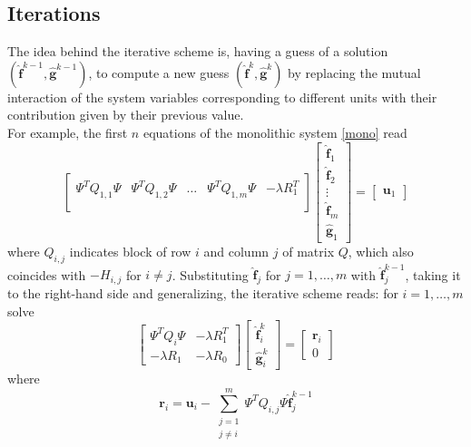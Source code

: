 \subsection{Iterations}
The idea behind the iterative scheme is, having a guess of a solution
$(\hat{\bm{f}}^{k-1},\hat{\bm{g}}^{k-1})$, to compute a new guess
$(\hat{\bm{f}}^k,\hat{\bm{g}}^k)$ by replacing the mutual interaction of the
system variables corresponding to different units with their contribution given
by their previous value.\\ For example, the first $n$ equations of the
monolithic system \ref{mono} read
\begin{equation}
	\begin{bmatrix}
		\Psi^TQ_{1,1}\Psi & \Psi^TQ_{1,2}\Psi & \dots & \Psi^TQ_{1,m}\Psi & -\lambda R_1^T \\
	\end{bmatrix}
	\begin{bmatrix}
		\hat{\bm{f}}_1 \\
		\hat{\bm{f}}_2 \\
		\vdots         \\
		\hat{\bm{f}}_m \\
		\hat{\bm{g}}_1
	\end{bmatrix}
	=
	\begin{bmatrix}
		\bm{u}_1
	\end{bmatrix}
\end{equation}
where $Q_{i,j}$ indicates block of row $i$ and column $j$ of matrix
$Q$, which also coincides with $-H_{i,j}$ for $i \neq j$. Substituting
$\hat{\bm{f}}_j$ for $j=1,\dots,m$ with $\hat{\bm{f}}_j^{k-1}$, taking it to
the right-hand side and generalizing, the iterative scheme reads: for $i = 1,
	\dots, m$ solve
\begin{equation}
	\begin{bmatrix}
		\Psi^TQ_i\Psi & -\lambda R_1^T \\
		-\lambda R_1  & -\lambda R_0
	\end{bmatrix}
	\begin{bmatrix}
		\hat{\bm{f}}_i^k \\
		\hat{\bm{g}}_i^k
	\end{bmatrix}
	=
	\begin{bmatrix}
		\bm{r}_i \\
		0
	\end{bmatrix}
\end{equation}
where
\begin{equation}
	\bm{r}_i =\bm{u}_i -\sum_{\substack{j=1\\ j\neq i}}^m \Psi^TQ_{i,j} \Psi \hat{\bm{f}}_j^{k-1}
\end{equation}

